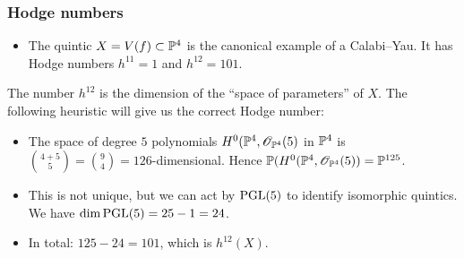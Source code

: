 \documentclass[UKenglish]{beamer}
\begin{document}
\begin{frame}
\frametitle{Hodge numbers}

\begin{itemize}
	\item The quintic $X=V(f) \subset \P^4$ is the canonical example of a Calabi--Yau. It has Hodge numbers $h^{11}=1$ and $h^{12}=101$.
\end{itemize}

\begin{remark}[Heuristic]
The number $h^{12}$ is the dimension of the ``space of parameters'' of $X$. The following heuristic will give us the correct Hodge number:
\begin{itemize}
	\item The space of degree $5$ polynomials $H^0(\P^4,\OO_{\P^4}(5)$ in $\P^4$ is $\binom{4+5}{5}=\binom{9}{4}=126$-dimensional. Hence $\P(H^0(\P^4,\OO_{\P^4}(5)) = \P^{125}$.
	\item This is not unique, but we can act by $\PGL(5)$ to identify isomorphic quintics. We have $\dim \PGL(5)=25-1=24$.
	\item In total: $125-24=101$, which is $h^{12}(X)$.
\end{itemize}
\end{remark}

\end{frame}
\end{document}
